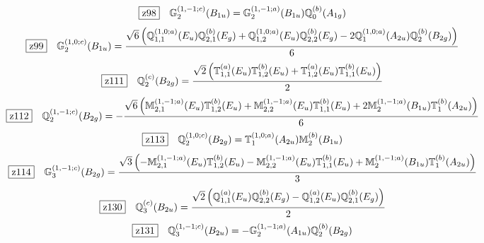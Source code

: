 \documentclass[fleqn,10pt,landscape]{jsarticle}
\begin{document}
\begin{dmath*}
\hspace*{3mm}\fbox{z98}\quad \mathbb{G}_{2}^{(1,-1;c)}(B_{1u})=\mathbb{G}_{2}^{(1,-1;a)}(B_{1u}) \mathbb{Q}_{0}^{(b)}(A_{1g})
\end{dmath*}
\begin{dmath*}
\hspace*{3mm}\fbox{z99}\quad \mathbb{G}_{2}^{(1,0;c)}(B_{1u})=\frac{\sqrt{6} \left(\mathbb{Q}_{1,1}^{(1,0;a)}(E_{u}) \mathbb{Q}_{2,1}^{(b)}(E_{g}) + \mathbb{Q}_{1,2}^{(1,0;a)}(E_{u}) \mathbb{Q}_{2,2}^{(b)}(E_{g}) - 2 \mathbb{Q}_{1}^{(1,0;a)}(A_{2u}) \mathbb{Q}_{2}^{(b)}(B_{2g})\right)}{6}
\end{dmath*}
\begin{dmath*}
\hspace*{3mm}\fbox{z111}\quad \mathbb{Q}_{2}^{(c)}(B_{2g})=\frac{\sqrt{2} \left(\mathbb{T}_{1,1}^{(a)}(E_{u}) \mathbb{T}_{1,2}^{(b)}(E_{u}) + \mathbb{T}_{1,2}^{(a)}(E_{u}) \mathbb{T}_{1,1}^{(b)}(E_{u})\right)}{2}
\end{dmath*}
\begin{dmath*}
\hspace*{3mm}\fbox{z112}\quad \mathbb{Q}_{2}^{(1,-1;c)}(B_{2g})=- \frac{\sqrt{6} \left(\mathbb{M}_{2,1}^{(1,-1;a)}(E_{u}) \mathbb{T}_{1,2}^{(b)}(E_{u}) + \mathbb{M}_{2,2}^{(1,-1;a)}(E_{u}) \mathbb{T}_{1,1}^{(b)}(E_{u}) + 2 \mathbb{M}_{2}^{(1,-1;a)}(B_{1u}) \mathbb{T}_{1}^{(b)}(A_{2u})\right)}{6}
\end{dmath*}
\begin{dmath*}
\hspace*{3mm}\fbox{z113}\quad \mathbb{Q}_{2}^{(1,0;c)}(B_{2g})=\mathbb{T}_{1}^{(1,0;a)}(A_{2u}) \mathbb{M}_{2}^{(b)}(B_{1u})
\end{dmath*}
\begin{dmath*}
\hspace*{3mm}\fbox{z114}\quad \mathbb{G}_{3}^{(1,-1;c)}(B_{2g})=\frac{\sqrt{3} \left(- \mathbb{M}_{2,1}^{(1,-1;a)}(E_{u}) \mathbb{T}_{1,2}^{(b)}(E_{u}) - \mathbb{M}_{2,2}^{(1,-1;a)}(E_{u}) \mathbb{T}_{1,1}^{(b)}(E_{u}) + \mathbb{M}_{2}^{(1,-1;a)}(B_{1u}) \mathbb{T}_{1}^{(b)}(A_{2u})\right)}{3}
\end{dmath*}
\begin{dmath*}
\hspace*{3mm}\fbox{z130}\quad \mathbb{Q}_{3}^{(c)}(B_{2u})=\frac{\sqrt{2} \left(\mathbb{Q}_{1,1}^{(a)}(E_{u}) \mathbb{Q}_{2,2}^{(b)}(E_{g}) - \mathbb{Q}_{1,2}^{(a)}(E_{u}) \mathbb{Q}_{2,1}^{(b)}(E_{g})\right)}{2}
\end{dmath*}
\begin{dmath*}
\hspace*{3mm}\fbox{z131}\quad \mathbb{Q}_{3}^{(1,-1;c)}(B_{2u})=- \mathbb{G}_{2}^{(1,-1;a)}(A_{1u}) \mathbb{Q}_{2}^{(b)}(B_{2g})
\end{dmath*}
\end{document}
